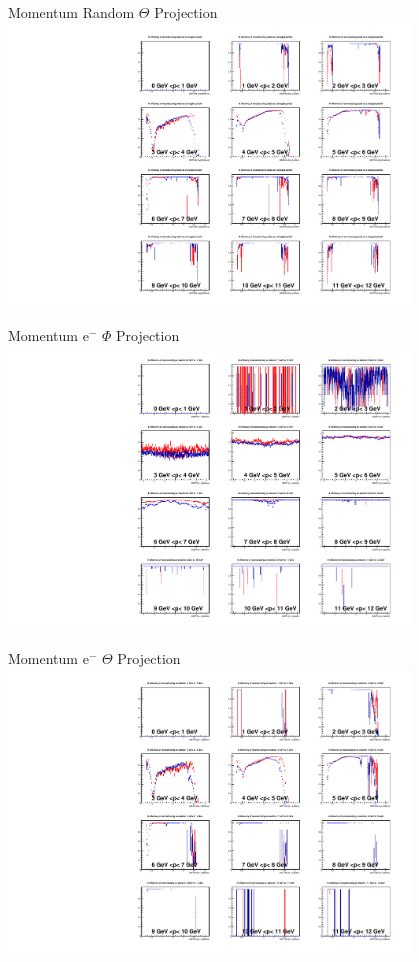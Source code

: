 \documentclass[10pt]{beamer}
\begin{document}
\begin{frame}{Momentum Random $\Theta$ Projection}
	\centering
	\includegraphics[width=0.8\textwidth]{Momentum/PMThetaRandom.pdf}
\end{frame}




\begin{frame}{Momentum $\textrm{e}^-$ $\Phi$ Projection}
	\centering
	\includegraphics[width=0.8\textwidth]{Momentum/PMPhiem.pdf}
\end{frame}


\begin{frame}{Momentum $\textrm{e}^-$ $\Theta$ Projection}
	\centering
	\includegraphics[width=0.8\textwidth]{Momentum/PMThetaem.pdf}
\end{frame}
\end{document}
